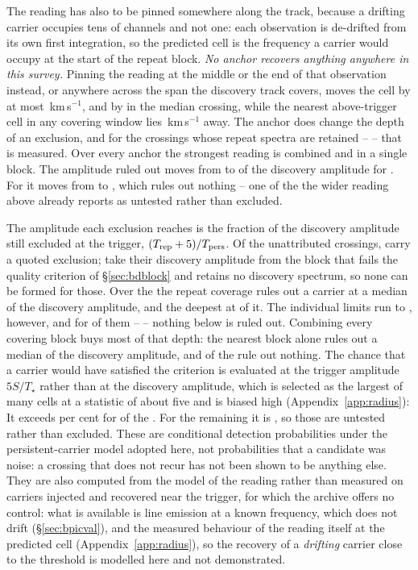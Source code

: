 The reading has also to be pinned somewhere along the track, because a
drifting carrier occupies tens of channels and not one: each observation is
de-drifted from its own first integration, so the predicted cell is the
frequency a carrier would occupy at the start of the repeat block. \emph{No anchor recovers anything anywhere in this survey.} Pinning the
reading at the middle or the end of that observation instead, or anywhere
across the span the discovery track covers, moves the cell by at most
\AnSpanMaxKms\,km\,s$^{-1}$, and by \AnSpanMedKms{} in the median crossing,
while the nearest above-trigger cell in any covering window lies
\AnNearKms\,km\,s$^{-1}$ away. The anchor does change the depth of an
exclusion, and for the \AnNMeas{} crossings whose repeat spectra are retained
-- \AnMeasStars{} -- that is measured. Over every anchor the strongest
reading is \AnTBest{} combined and \AnTSingle{} in a single block. The amplitude ruled out moves from \AnOtherFrom{} to \AnOtherTo{} of the
discovery amplitude for \AnOtherStar. For \AnWorstStar{} it moves from
\AnFracFrom{} to \AnFracTo, which rules out nothing -- one of the
\AnNWideVac{} the wider reading above already reports as untested rather than
excluded.

The amplitude each exclusion reaches is the fraction of the discovery
amplitude still excluded at the trigger, $(T_{\rm rep}+5)/T_{\rm pers}$. Of
the \RcNTested{} unattributed crossings, \RcNExcl{} carry a quoted exclusion;
\RcNWithheld{} take their discovery amplitude from the block that fails the
quality criterion of \S\ref{sec:bdblock} and \RcNNoSpec{} retains no discovery
spectrum, so none can be formed for those. Over the \RcNExcl{} the repeat coverage rules out a carrier at a median
\RcFracMed{} of the discovery amplitude, and the deepest at \RcFracMin{} of
it. The individual limits run to \RcFracMax, however, and for \RcNFracWeak{}
of them -- \RcFracWeakList{} -- nothing below \RcFracWeakLo{} is ruled out.
Combining every covering block buys most of that depth: the nearest block
alone rules out a median \TjFracNearMed{} of the discovery amplitude, and
\TjNNearWeak{} of the \RcNExcl{} rule out nothing. The chance that a carrier would have satisfied the criterion is
evaluated at the trigger amplitude $5S/T_\star$ rather than at the
discovery amplitude, which is selected as the largest of many cells at a
statistic of about five and is biased high (Appendix~\ref{app:radius}): It exceeds \RcPowerLevel{} per cent for \RqNPowerHi{} of the \RcNExcl.
For the remaining \RcNPowerLoTrig{} it is \RqLowList, so those are untested
rather than excluded. These are conditional detection probabilities
under the persistent-carrier model adopted here, not probabilities that a
candidate was noise: a crossing that does not recur has not been shown to be
anything else. They are also computed from the model of the reading rather
than measured on carriers injected and recovered near the trigger, for which
the archive offers no control: what is available is line emission at a known
frequency, which does not drift
(\S\ref{sec:bpicval}), and the measured behaviour of the reading itself at
the predicted cell (Appendix~\ref{app:radius}), so the recovery of a
\emph{drifting} carrier close to the threshold is modelled here and not
demonstrated.

